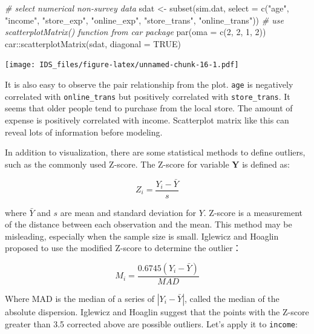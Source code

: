 \documentclass[
  12pt,
]{krantz}
\makeatletter
\newenvironment{Shaded}{\begin{snugshade}}{\end{snugshade}}
\newcommand{\AttributeTok}[1]{\textcolor[rgb]{0.61,0.61,0.61}{#1}}
\newcommand{\CommentTok}[1]{\textcolor[rgb]{0.37,0.37,0.37}{\textit{#1}}}
\newcommand{\ConstantTok}[1]{\textcolor[rgb]{0,0,0}{#1}}
\newcommand{\DecValTok}[1]{\textcolor[rgb]{0.06,0.06,0.06}{#1}}
\newcommand{\FunctionTok}[1]{\textcolor[rgb]{0,0,0}{#1}}
\newcommand{\NormalTok}[1]{#1}
\newcommand{\OtherTok}[1]{\textcolor[rgb]{0.37,0.37,0.37}{#1}}
\newcommand{\SpecialCharTok}[1]{\textcolor[rgb]{0,0,0}{#1}}
\newcommand{\StringTok}[1]{\textcolor[rgb]{0.5,0.5,0.5}{#1}}
\newenvironment{kframe}{%
\medskip{}
\setlength{\fboxsep}{.8em}
 \def\at@end@of@kframe{}%
 \ifinner\ifhmode%
  \def\at@end@of@kframe{\end{minipage}}%
  \begin{minipage}{\columnwidth}%
 \fi\fi%
 \def\FrameCommand##1{\hskip\@totalleftmargin \hskip-\fboxsep
 \colorbox{shadecolor}{##1}\hskip-\fboxsep
     \hskip-\linewidth \hskip-\@totalleftmargin \hskip\columnwidth}%
 \MakeFramed {\advance\hsize-\width
   \@totalleftmargin\z@ \linewidth\hsize
   \@setminipage}}%
 {\par\unskip\endMakeFramed%
 \at@end@of@kframe}
\renewenvironment{Shaded}{\begin{kframe}}{\end{kframe}}
\makeatother
\begin{document}
\begin{Shaded}
\begin{Highlighting}[]
\CommentTok{\# select numerical non{-}survey data}
\NormalTok{sdat }\OtherTok{\textless{}{-}} \FunctionTok{subset}\NormalTok{(sim.dat, }\AttributeTok{select =} \FunctionTok{c}\NormalTok{(}\StringTok{"age"}\NormalTok{, }\StringTok{"income"}\NormalTok{, }\StringTok{"store\_exp"}\NormalTok{, }
    \StringTok{"online\_exp"}\NormalTok{, }\StringTok{"store\_trans"}\NormalTok{, }\StringTok{"online\_trans"}\NormalTok{))}
\CommentTok{\# use scatterplotMatrix() function from car package}
\FunctionTok{par}\NormalTok{(}\AttributeTok{oma =} \FunctionTok{c}\NormalTok{(}\DecValTok{2}\NormalTok{, }\DecValTok{2}\NormalTok{, }\DecValTok{1}\NormalTok{, }\DecValTok{2}\NormalTok{))}
\NormalTok{car}\SpecialCharTok{::}\FunctionTok{scatterplotMatrix}\NormalTok{(sdat, }\AttributeTok{diagonal =} \ConstantTok{TRUE}\NormalTok{)}
\end{Highlighting}
\end{Shaded}

\texttt{[image: IDS\_files/figure-latex/unnamed-chunk-16-1.pdf]}

It is also easy to observe the pair relationship from the plot. \texttt{age} is negatively correlated with \texttt{online\_trans} but positively correlated with \texttt{store\_trans}. It seems that older people tend to purchase from the local store. The amount of expense is positively correlated with income. Scatterplot matrix like this can reveal lots of information before modeling.

In addition to visualization, there are some statistical methods to define outliers, such as the commonly used Z-score. The Z-score for variable \(\mathbf{Y}\) is defined as:

\[Z_{i}=\frac{Y_{i}-\bar{Y}}{s}\]

where \(\bar{Y}\) and \(s\) are mean and standard deviation for \(Y\). Z-score is a measurement of the distance between each observation and the mean. This method may be misleading, especially when the sample size is small. Iglewicz and Hoaglin proposed to use the modified Z-score to determine the outlier\citep{mad1}：

\[M_{i}=\frac{0.6745(Y_{i}-\bar{Y})}{MAD}\]

Where MAD is the median of a series of \(|Y_ {i} - \bar{Y}|\), called the median of the absolute dispersion. Iglewicz and Hoaglin suggest that the points with the Z-score greater than 3.5 corrected above are possible outliers. Let's apply it to \texttt{income}:
\end{document}
